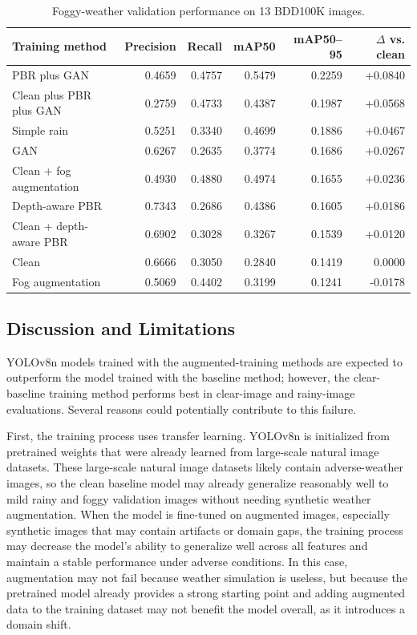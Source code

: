 \documentclass[10pt,letterpaper]{article}
\begin{document}
\begin{table}[!htbp]
\centering
\caption{Foggy-weather validation performance on 13 BDD100K images.}
\label{tab:foggy-weather-results}
\begin{tabular*}{\textwidth}{@{\extracolsep{\fill}}lrrrrr@{}}
\toprule
Training method & Precision & Recall & mAP50 & mAP50--95 & $\Delta$ vs. clean \\
\midrule
PBR plus GAN & 0.4659 & 0.4757 & 0.5479 & 0.2259 & +0.0840 \\
Clean plus PBR plus GAN & 0.2759 & 0.4733 & 0.4387 & 0.1987 & +0.0568 \\
Simple rain & 0.5251 & 0.3340 & 0.4699 & 0.1886 & +0.0467 \\
GAN & 0.6267 & 0.2635 & 0.3774 & 0.1686 & +0.0267 \\
Clean + fog augmentation & 0.4930 & 0.4880 & 0.4974 & 0.1655 & +0.0236 \\
Depth-aware PBR & 0.7343 & 0.2686 & 0.4386 & 0.1605 & +0.0186 \\
Clean + depth-aware PBR & 0.6902 & 0.3028 & 0.3267 & 0.1539 & +0.0120 \\
Clean & 0.6666 & 0.3050 & 0.2840 & 0.1419 & 0.0000 \\
Fog augmentation & 0.5069 & 0.4402 & 0.3199 & 0.1241 & -0.0178 \\
\bottomrule
\end{tabular*}
\end{table}

\subsection{Discussion and Limitations}
\label{sec:section-limitations}

YOLOv8n models trained with the augmented-training methods are expected to outperform the model trained with the baseline method; 
however, the clear-baseline training method performs best in clear-image and rainy-image evaluations. Several reasons could potentially contribute to this failure.

First, the training process uses transfer learning. YOLOv8n is initialized from pretrained weights that were already learned from large-scale natural image datasets. 
These large-scale natural image datasets likely contain adverse-weather images, so the clean baseline model may already generalize reasonably well to mild rainy and foggy validation images without needing synthetic weather augmentation.
When the model is fine-tuned on augmented images, especially synthetic images that may contain artifacts or domain gaps, the training process may 
decrease the model's ability to generalize well across all features and maintain a stable performance under adverse conditions.
In this case, augmentation may not fail because weather simulation is useless, but because the pretrained model already provides a strong starting point and
adding augmented data to the training dataset may not benefit the model overall, as it introduces a domain shift.
\end{document}
